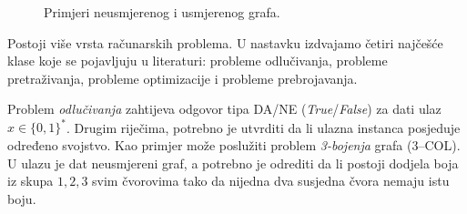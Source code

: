 \begin{figure}[ht]
	\centering
	
	\caption{Primjeri neusmjerenog i usmjerenog grafa.}
	\label{fig:graphs}
\end{figure}

Postoji više vrsta računarskih problema. U nastavku izdvajamo četiri najčešće klase koje se pojavljuju u literaturi: probleme odlučivanja, probleme pretraživanja, probleme optimizacije i probleme prebrojavanja.

Problem \textit{odlučivanja} zahtijeva odgovor tipa DA/NE (\emph{True}/\emph{False}) za dati ulaz $x \in \{0,1\}^*$. Drugim riječima, potrebno je utvrditi da li ulazna instanca posjeduje određeno svojstvo. Kao primjer može poslužiti problem \textit{3-bojenja} grafa (3--COL). U ulazu je dat neusmjereni graf, a potrebno je odrediti da li postoji dodjela boja iz skupa ${1,2,3}$ svim čvorovima tako da nijedna dva susjedna čvora nemaju istu boju.

